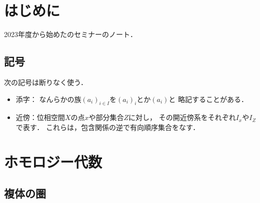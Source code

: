 \maketitle
\layout
\chapter*{はじめに}
2023年度から始めた\cite{KS90}のセミナーのノート．

\section*{記号}
次の記号は断りなく使う．
\begin{itemize}
    \item 添字：
    なんらかの族$(a_i)_{i\in I}$を$(a_i)_i$とか$(a_i)$と
    略記することがある．
    \item 近傍：位相空間\(X\)の点\(x\)や部分集合\(Z\)に対し，
    その開近傍系をそれぞれ\(I_x\)や\(I_Z\)で表す．
    これらは，包含関係の逆で有向順序集合をなす．
\end{itemize}
\tableofcontents
\chapter{ホモロジー代数}
\setcounter{section}{2}

\section{複体の圏}

